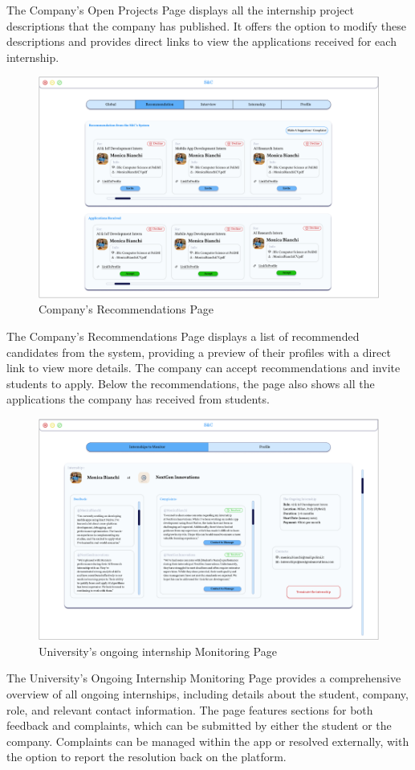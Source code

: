 The Company's Open Projects Page displays all the internship project descriptions that the company has published. It offers the option to modify these descriptions and provides direct links to view the applications received for each internship.

\begin{figure}[H]
    \centering
    \includegraphics[width=1\linewidth]{DD//Images/UI photos/Company's reccomendations.png}
    \caption{Company's Recommendations Page}
\end{figure}

The Company's Recommendations Page displays a list of recommended candidates from the system, providing a preview of their profiles with a direct link to view more details. The company can accept recommendations and invite students to apply. Below the recommendations, the page also shows all the applications the company has received from students.

\begin{figure}[H]
    \centering
    \includegraphics[width=1\linewidth]{DD//Images/UI photos/Universities Monitoring.png}
    \caption{University's ongoing internship Monitoring Page}
\end{figure}

The University's Ongoing Internship Monitoring Page provides a comprehensive overview of all ongoing internships, including details about the student, company, role, and relevant contact information. The page features sections for both feedback and complaints, which can be submitted by either the student or the company. Complaints can be managed within the app or resolved externally, with the option to report the resolution back on the platform.